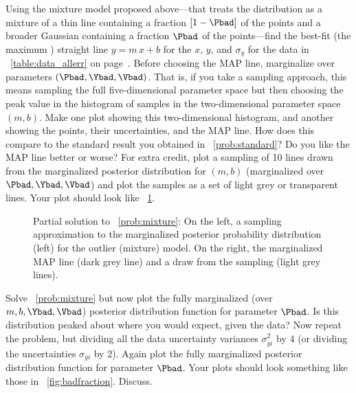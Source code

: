 \documentclass[12pt,twoside,pdftex]{article}
\begin{document}
\begin{problem}\label{prob:mixture}
Using the mixture model proposed above---that treats the distribution
as a mixture of a thin line containing a fraction $[1-\Pbad]$ of the
points and a broader Gaussian containing a fraction $\Pbad$ of the
points---find the best-fit (the maximum \aposteriori) straight line
$y=m\,x+b$ for the $x$, $y$, and $\sigma_y$ for the data in
\tablename~\ref{table:data_allerr} on
page~\pageref{table:data_allerr}.  Before choosing the MAP line,
marginalize over parameters $(\Pbad,\Ybad,\Vbad)$.  That is, if you
take a sampling approach, this means sampling the full
five-dimensional parameter space but then choosing the peak value in
the histogram of samples in the two-dimensional parameter space
$(m,b)$.  Make one plot showing this two-dimensional histogram, and
another showing the points, their uncertainties, and the MAP line.
How does this compare to the standard result you obtained in
\problemname~\ref{prob:standard}?  Do you like the MAP line better or
worse?  For extra credit, plot a sampling of 10 lines drawn from the
marginalized posterior distribution for $(m,b)$ (marginalized over
$\Pbad,\Ybad,\Vbad$) and plot the samples as a set of light grey or
transparent lines.  Your plot should look like
\figurename~\ref{fig:mixture}.
\end{problem}

\begin{figure}[htbp]
\caption{Partial solution to \problemname~\ref{prob:mixture}: On the
left, a sampling approximation to the marginalized posterior
probability distribution (left) for the outlier (mixture) model.  On
the right, the marginalized MAP line (dark grey line) and a draw from
the sampling (light grey lines).}\label{fig:mixture}
\end{figure}

\begin{problem}\label{prob:badfraction}
Solve \problemname~\ref{prob:mixture} but now plot the fully
marginalized (over $m,b,\Ybad,\Vbad$) posterior distribution function
for parameter $\Pbad$.  Is this distribution peaked about where you
would expect, given the data?  Now repeat the problem, but dividing
all the data uncertainty variances $\sigma_{yi}^2$ by 4 (or dividing
the uncertainties $\sigma_{yi}$ by 2).  Again plot the fully
marginalized posterior distribution function for parameter $\Pbad$.
Your plots should look something like those in
\figurename~\ref{fig:badfraction}.  Discuss.
\end{problem}
\end{document}
